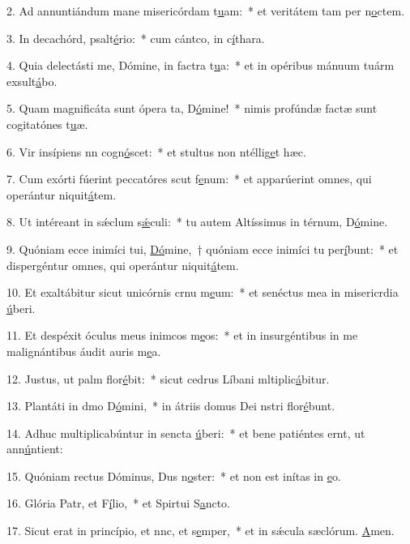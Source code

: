 2. Ad annuntiándum mane misericórdam t\uline{u}am:~* et veritátem tam per n\uline{o}ctem.\par 
3. In decachórd, psalt\uline{é}rio:~* cum cántco, in c\uline{í}thara.\par 
4. Quia delectásti me, Dómine, in factra t\uline{u}a:~* et in opéribus mánuum tuárm exsult\uline{á}bo.\par 
5. Quam magnificáta sunt ópera ta, D\uline{ó}mine!~* nimis profúndæ factæ sunt cogitatónes t\uline{u}æ.\par 
6. Vir insípiens nn cogn\uline{ó}scet:~* et stultus non ntéllig\uline{e}t hæc.\par 
7. Cum exórti fúerint peccatóres scut f\uline{e}num:~* et apparúerint omnes, qui operántur niquit\uline{á}tem.\par 
8. Ut intéreant in sǽclum s\uline{ǽ}culi:~* tu autem Altíssimus in térnum, D\uline{ó}mine.\par 
9. Quóniam ecce inimíci tui, \uline{Dó}mine,~† quóniam ecce inimíci tu per\uline{í}bunt:~* et dispergéntur omnes, qui operántur niquit\uline{á}tem.\par 
10. Et exaltábitur sicut unicórnis crnu m\uline{e}um:~* et senéctus mea in misericrdia \uline{ú}beri.\par 
11. Et despéxit óculus meus inimcos m\uline{e}os:~* et in insurgéntibus in me malignántibus áudit auris m\uline{e}a.\par 
12. Justus, ut palm flor\uline{é}bit:~* sicut cedrus Líbani mltiplic\uline{á}bitur.\par 
13. Plantáti in dmo D\uline{ó}mini,~* in átriis domus Dei nstri flor\uline{é}bunt.\par 
14. Adhuc multiplicabúntur in sencta \uline{ú}beri:~* et bene patiéntes ernt, ut ann\uline{ú}ntient:\par 
15. Quóniam rectus Dóminus, Dus n\uline{o}ster:~* et non est inítas in \uline{e}o.\par 
16. Glória Patr, et F\uline{í}lio,~* et Spirtui S\uline{a}ncto.\par 
17. Sicut erat in princípio, et nnc, et s\uline{e}mper,~* et in sǽcula sæclórum. \uline{A}men.\par 
